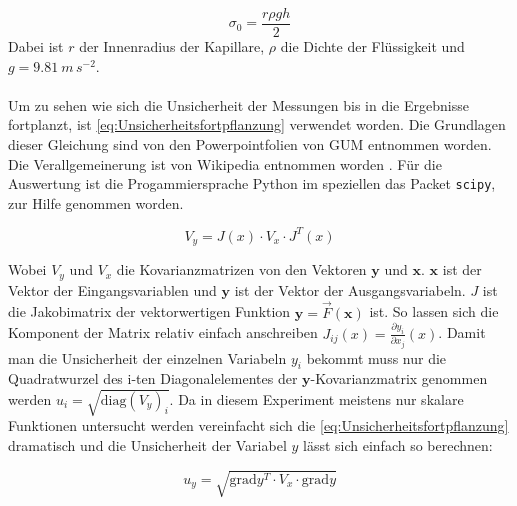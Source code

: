 \documentclass[11pt]{scrartcl}
\begin{document}
\begin{equation}
    \label{eq:Oberflauechenspannung_Kapillare}
    \sigma_0 = \frac{r \rho g h}{2}
\end{equation}
Dabei ist $r$ der Innenradius der Kapillare, $\rho$ die Dichte der Flüssigkeit und $g = \SI[]{9,81}{m\, s^{-2}}$.
\\ \\
Um zu sehen wie sich die Unsicherheit der Messungen bis in die Ergebnisse 
fortplanzt, ist \autoref{eq:Unsicherheitsfortpflanzung} verwendet worden.
Die Grundlagen dieser Gleichung sind von den Powerpointfolien von 
GUM entnommen worden.\cite{Kessel2004} Die Verallgemeinerung ist von Wikipedia entnommen
worden \cite{2020Fehler}.
Für die Auswertung ist die Progammiersprache Python im speziellen das 
Packet \verb#scipy#, zur Hilfe genommen worden.

\begin{equation}
    \label{eq:Unsicherheitsfortpflanzung}
    V_y = J(x) \cdot V_x \cdot J^{T}(x)
\end{equation}

Wobei $V_y$ und $V_x$ die Kovarianzmatrizen von den Vektoren $\bm{y}$ und $\bm{x}$.
$\bm{x}$ ist der Vektor der Eingangsvariablen und $\bm{y}$ ist der Vektor der Ausgangsvariabeln.
$J$ ist die Jakobimatrix der vektorwertigen Funktion $\bm{y} = \vec{F}(\bm{x})$ ist.
So lassen sich die Komponent der Matrix relativ einfach anschreiben $J_{ij}(x) = \frac{\partial{y_i}}{\partial{x_j}}(x)$.
Damit man die Unsicherheit der einzelnen Variabeln $y_i$ bekommt muss nur die Quadratwurzel des i-ten Diagonalelementes der 
$\bm{y}$-Kovarianzmatrix genommen werden $u_i= \sqrt{\mathrm{diag}(V_y)_i}$.
Da in diesem Experiment meistens nur skalare Funktionen untersucht werden vereinfacht
sich die \autoref{eq:Unsicherheitsfortpflanzung} dramatisch und die Unsicherheit
der Variabel $y$ lässt sich einfach so berechnen:

\begin{equation}
    \label{eq:graduncentainty}
    u_y = \sqrt{\mathrm{grad} y^T \cdot V_x \cdot \mathrm{grad} y}
\end{equation}
\end{document}

